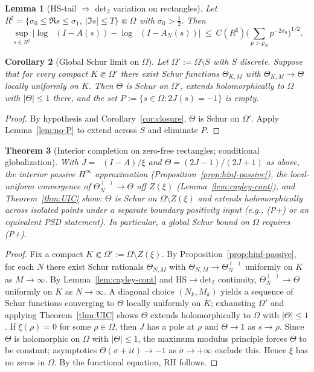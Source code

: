 \documentclass[11pt]{article}
\newtheorem{theorem}{Theorem}
\newtheorem{lemma}[theorem]{Lemma}
\newtheorem{corollary}[theorem]{Corollary}
\theoremstyle{definition}
\theoremstyle{remark}
\DeclareMathOperator{\dettwo}{det_2}
\begin{document}
\begin{lemma}[HS-tail \(\Rightarrow\) det$_2$ variation on rectangles]\label{lem:HS-tail-rectangle}
Let \(R^\sharp=\{\sigma_0\le \Re s\le \sigma_1,\ |\Im s|\le T\}\Subset\Omega\) with \(\sigma_0>\tfrac12\). Then
\[
 \sup_{s\in R^\sharp}\big|\log\dettwo(I-A(s))\!-\!\log\dettwo(I-A_N(s))\big|\ \le\ C(R^\sharp)\Big(\sum_{p>p_N}p^{-2\sigma_0}\Big)^{1/2}.
\]
\end{lemma}
\begin{corollary}[Global Schur limit on \(\Omega\)]
Let \(\Omega':=\Omega\setminus S\) with \(S\) discrete. Suppose that for every compact \(K\Subset\Omega'\) there exist Schur functions \(\Theta_{K,M}\) with \(\Theta_{K,M}\to\Theta\) locally uniformly on \(K\). Then \(\Theta\) is Schur on \(\Omega'\), extends holomorphically to \(\Omega\) with \(|\Theta|\le 1\) there, and the set \(P:=\{s\in\Omega: 2J(s)=-1\}\) is empty.
\end{corollary}
\begin{proof}
By hypothesis and Corollary~\ref{cor:closure}, \(\Theta\) is Schur on \(\Omega'\). Apply Lemma~\ref{lem:no-P} to extend across \(S\) and eliminate \(P\). 
\end{proof}
\begin{theorem}[Interior completion on zero-free rectangles; conditional globalization]\label{thm:interior-completion}
With \(J=\dettwo(I-A)/\xi\) and \(\Theta=(2J-1)/(2J+1)\) as above, the interior passive \(H^\infty\) approximation (Proposition~\ref{prop:hinf-passive}), the local-uniform convergence of \(\Theta_N^{(\dettwo)}\to\Theta\) off \(Z(\xi)\) (Lemma~\ref{lem:cayley-cont}), and Theorem~\ref{thm:UIC} show: \(\Theta\) is Schur on \(\Omega\setminus Z(\xi)\) and extends holomorphically across isolated points under a separate boundary positivity input (e.g., (P+) or an equivalent PSD statement). In particular, a global Schur bound on \(\Omega\) requires (P+). 
\end{theorem}
\begin{proof}
Fix a compact \(K\Subset\Omega':=\Omega\setminus Z(\xi)\). By Proposition~\ref{prop:hinf-passive}, for each \(N\) there exist Schur rationals \(\Theta_{N,M}\) with \(\Theta_{N,M}\to\Theta_N^{(\dettwo)}\) uniformly on \(K\) as \(M\to\infty\). By Lemma~\ref{lem:cayley-cont} and HS\(\to\)det$_2$ continuity, \(\Theta_N^{(\dettwo)}\to\Theta\) uniformly on \(K\) as \(N\to\infty\). A diagonal choice \((N_k,M_k)\) yields a sequence of Schur functions converging to \(\Theta\) locally uniformly on \(K\); exhausting \(\Omega'\) and applying Theorem~\ref{thm:UIC} shows \(\Theta\) extends holomorphically to \(\Omega\) with \(|\Theta|\le 1\).
If \(\xi(\rho)=0\) for some \(\rho\in\Omega\), then \(J\) has a pole at \(\rho\) and \(\Theta\to 1\) as \(s\to\rho\). Since \(\Theta\) is holomorphic on \(\Omega\) with \(|\Theta|\le 1\), the maximum modulus principle forces \(\Theta\) to be constant; asymptotics \(\Theta(\sigma+it)\to -1\) as \(\sigma\to+\infty\) exclude this. Hence \(\xi\) has no zeros in \(\Omega\). By the functional equation, RH follows.
\end{proof}
\end{document}
